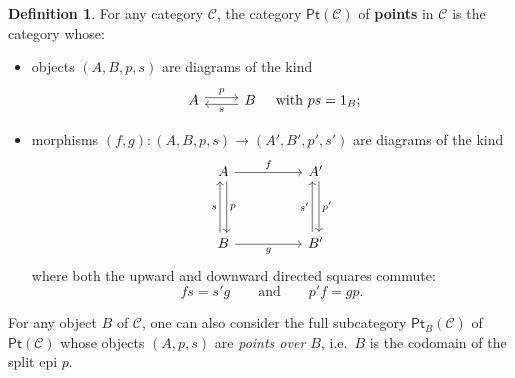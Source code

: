 \documentclass{amsart}
\theoremstyle{definition}
\newtheorem{definition}[theorem]{Definition}
\begin{document}
\begin{definition}
For any category $\mathcal{C}$, the category $\mathsf{Pt}(\mathcal{C})$ of \textbf{points} in $\mathcal{C}$ is the category whose:

\begin{itemize}
    \item objects $(A,B,p,s)$ are diagrams of the kind
    \[
      \begin{tikzcd}
        A \arrow[r, shift left, "p"] & B \arrow[l, shift left, "s"]
      \end{tikzcd}
      \quad \text{with } ps = 1_B;
    \]

    \item morphisms $(f,g) \colon (A,B,p,s) \to (A',B',p',s')$ are diagrams of the kind
    \[
    \begin{tikzcd}[ampersand replacement=\&]
	A \&\& {A^\prime} \\
	\\
	B \&\& {B^\prime}
	\arrow["f", from=1-1, to=1-3]
	\arrow["p", shift left, from=1-1, to=3-1]
	\arrow["{p^\prime}", shift left, from=1-3, to=3-3]
	\arrow["s", shift left, from=3-1, to=1-1]
	\arrow["g"', from=3-1, to=3-3]
	\arrow["{s^\prime}", shift left, from=3-3, to=1-3]
    \end{tikzcd}
    \]
    where both the upward and downward directed squares commute:
    \[
      fs = s'g \qquad \text{and} \qquad p'f = g p.
    \]
\end{itemize}
\end{definition}


For any object $B$ of $\mathcal{C}$, one can also consider the full subcategory $\mathsf{Pt}_{B}(\mathcal C)$ of $\mathsf{Pt}(\mathcal{C})$ whose objects $(A,p,s)$ are \emph{points over $B$}, i.e.\ $B$ is the codomain of the split epi $p$.



\medskip
\end{document}
